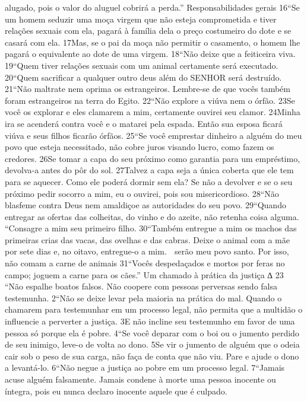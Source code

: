alugado, pois o valor do aluguel cobrirá a perda.”
Responsabilidades gerais
16“Se um homem seduzir uma moça virgem que não esteja comprometida e tiver
relações sexuais com ela, pagará à família dela o preço costumeiro do dote e se
casará com ela. 17Mas, se o pai da moça não permitir o casamento, o homem lhe
pagará o equivalente ao dote de uma virgem.
   18“Não deixe que a feiticeira viva.
   19“Quem tiver relações sexuais com um animal certamente será executado.
   20“Quem sacrificar a qualquer outro deus além do SENHOR será destruído.
   21“Não maltrate nem oprima os estrangeiros. Lembre-se de que vocês também
foram estrangeiros na terra do Egito.
   22“Não explore a viúva nem o órfão. 23Se você os explorar e eles clamarem a
mim, certamente ouvirei seu clamor. 24Minha ira se acenderá contra você e o
matarei pela espada. Então sua esposa ficará viúva e seus filhos ficarão órfãos.
   25“Se você emprestar dinheiro a alguém do meu povo que esteja necessitado,
não cobre juros visando lucro, como fazem os credores. 26Se tomar a capa do seu
próximo como garantia para um empréstimo, devolva-a antes do pôr do sol.
27Talvez a capa seja a única coberta que ele tem para se aquecer. Como ele poderá
dormir sem ela? Se não a devolver e se o seu próximo pedir socorro a mim, eu o
ouvirei, pois sou misericordioso.
   28“Não blasfeme contra Deus nem amaldiçoe as autoridades do seu povo.
   29“Quando entregar as ofertas das colheitas, do vinho e do azeite, não retenha
coisa alguma.
   “Consagre a mim seu primeiro filho.
   30“Também entregue a mim os machos das primeiras crias das vacas, das
ovelhas e das cabras. Deixe o animal com a mãe por sete dias e, no oitavo,
entregue-o a mim.
           serão meu povo santo. Por isso, não comam a carne de animais
    31“Vocês
despedaçados e mortos por feras no campo; joguem a carne para os cães.”
Um chamado à prática da justiça
∆   23 “Não espalhe boatos falsos. Não coopere com pessoas perversas sendo
falsa testemunha.
   2“Não se deixe levar pela maioria na prática do mal. Quando o chamarem para
testemunhar em um processo legal, não permita que a multidão o influencie a
perverter a justiça. 3E não incline seu testemunho em favor de uma pessoa só
porque ela é pobre.
   4“Se você deparar com o boi ou o jumento perdido de seu inimigo, leve-o de
volta ao dono. 5Se vir o jumento de alguém que o odeia cair sob o peso de sua
carga, não faça de conta que não viu. Pare e ajude o dono a levantá-lo.
   6“Não negue a justiça ao pobre em um processo legal.
   7“Jamais acuse alguém falsamente. Jamais condene à morte uma pessoa
inocente ou íntegra, pois eu nunca declaro inocente aquele que é culpado.
